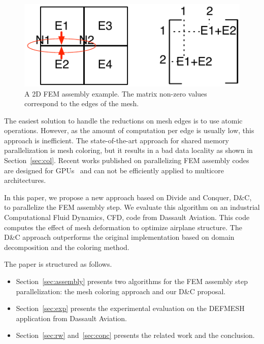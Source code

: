 \documentclass[10pt]{IOS-Book-Article}
\begin{document}
\begin{figure}[tp]
 \includegraphics[scale=0.6]{FEM_ass.pdf}
 \caption{A 2D FEM assembly example. The matrix non-zero values correspond to the edges of the mesh.}
 \label{fig:2Dasm}
\end{figure}

The easiest solution to handle the reductions on mesh edges is to use atomic operations.
However, as the amount of computation per edge is usually low, this approach is inefficient.
The state-of-the-art approach for shared memory parallelization is mesh coloring, but it results in a bad data locality as shown in Section~\ref{sec:col}.
Recent works published on parallelizing FEM assembly codes are designed for GPUs~\cite{cecka2011assembly,CPUGPUasm} and can not be efficiently applied to multicore architectures.

In this paper, we propose a new approach based on Divide and Conquer, D\&C, to parallelize the FEM assembly step.
We evaluate this algorithm on an industrial Computational Fluid Dynamics, CFD, code from Dassault Aviation.
This code computes the effect of mesh deformation to optimize airplane structure.
The D\&C approach outperforms the original implementation based on domain decomposition and the coloring method.

The paper is structured as follows.
\begin{itemize}
\item Section~\ref{sec:assembly} presents  two algorithms for the FEM assembly step parallelization: the mesh coloring approach and our D\&C proposal.
\item Section~\ref{sec:exp} presents the experimental evaluation on the DEFMESH application from Dassault Aviation.
\item Section~\ref{sec:rw} and~\ref{sec:conc} presents the related work and the conclusion.
\end{itemize}

\end{document}
